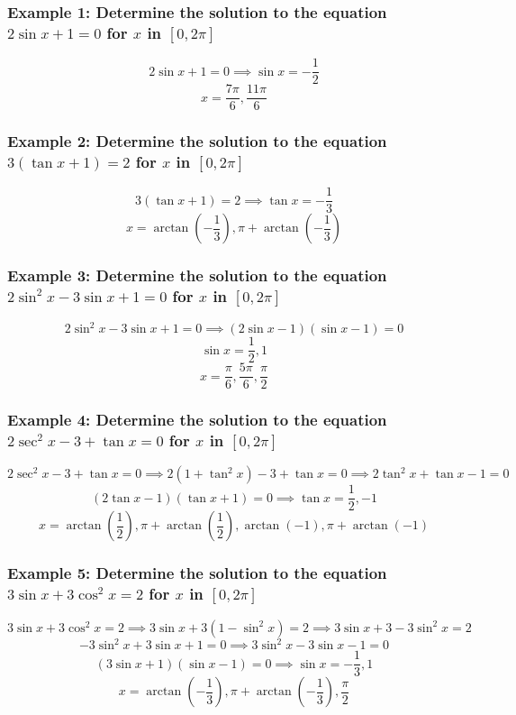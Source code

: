 \documentclass{article}
\begin{document}
\subsubsection*{Example 1: Determine the solution to the equation \( 2\sin x + 1 = 0 \) for \( x \) in \([0, 2\pi]\)}

\[
2\sin x + 1 = 0 \implies \sin x = -\frac{1}{2}
\]
\[
x = \frac{7\pi}{6}, \frac{11\pi}{6}
\]

\subsubsection*{Example 2: Determine the solution to the equation \( 3(\tan x + 1) = 2 \) for \( x \) in \([0, 2\pi]\)}

\[
3(\tan x + 1) = 2 \implies \tan x = -\frac{1}{3}
\]
\[
x = \arctan\left(-\frac{1}{3}\right), \pi + \arctan\left(-\frac{1}{3}\right)
\]

\subsubsection*{Example 3: Determine the solution to the equation \( 2\sin^2 x - 3\sin x + 1 = 0 \) for \( x \) in \([0, 2\pi]\)}

\[
2\sin^2 x - 3\sin x + 1 = 0 \implies (2\sin x - 1)(\sin x - 1) = 0
\]
\[
\sin x = \frac{1}{2}, 1
\]
\[
x = \frac{\pi}{6}, \frac{5\pi}{6}, \frac{\pi}{2}
\]

\subsubsection*{Example 4: Determine the solution to the equation \( 2\sec^2 x - 3 + \tan x = 0 \) for \( x \) in \([0, 2\pi]\)}

\[
2\sec^2 x - 3 + \tan x = 0 \implies 2(1 + \tan^2 x) - 3 + \tan x = 0 \implies 2\tan^2 x + \tan x - 1 = 0
\]
\[
(2\tan x - 1)(\tan x + 1) = 0 \implies \tan x = \frac{1}{2}, -1
\]
\[
x = \arctan\left(\frac{1}{2}\right), \pi + \arctan\left(\frac{1}{2}\right), \arctan(-1), \pi + \arctan(-1)
\]

\subsubsection*{Example 5: Determine the solution to the equation \( 3\sin x + 3\cos^2 x = 2 \) for \( x \) in \([0, 2\pi]\)}

\[
3\sin x + 3\cos^2 x = 2 \implies 3\sin x + 3(1 - \sin^2 x) = 2 \implies 3\sin x + 3 - 3\sin^2 x = 2
\]
\[
-3\sin^2 x + 3\sin x + 1 = 0 \implies 3\sin^2 x - 3\sin x - 1 = 0
\]
\[
(3\sin x + 1)(\sin x - 1) = 0 \implies \sin x = -\frac{1}{3}, 1
\]
\[
x = \arctan(-\frac{1}{3}), \pi + \arctan(-\frac{1}{3}), \frac{\pi}{2}
\]
\end{document}
